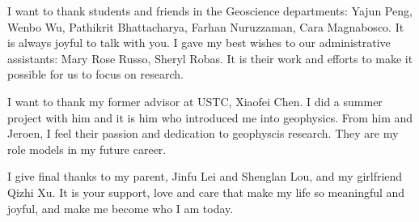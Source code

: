 I want to thank students and friends in the Geoscience departments: Yajun Peng, Wenbo Wu, 
Pathikrit Bhattacharya, Farhan Nuruzzaman, Cara Magnabosco. It is always joyful to talk
with you. I gave my best wishes to our administrative assistants: Mary
Rose Russo, Sheryl Robas. It is their work and efforts to make it possible for us
to focus on research.

I want to thank my former advisor at USTC, Xiaofei Chen. I did a summer project with him
and it is him who introduced me into geophysics. From him and Jeroen, I feel their passion
and dedication to geophyscis research. They are my role models in my future career.

I give final thanks to my parent, Jinfu Lei and Shenglan Lou, and my girlfriend Qizhi Xu.
It is your support, love and care that make my life so meaningful and joyful, and make
me become who I am today.

